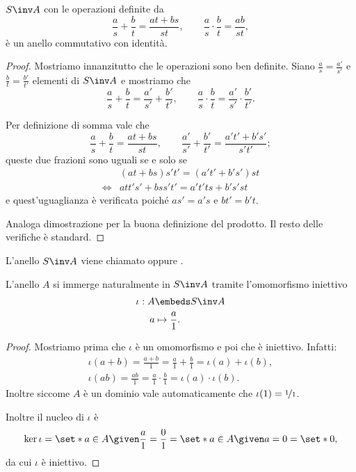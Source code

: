 \begin{proposition}{}{}
    $S\inv A$ con le operazioni definite da \[
        \frac{a}{s} + \frac{b}{t} = \frac{at + bs}{st}, \qquad \frac{a}{s} \cdot \frac{b}{t} = \frac{ab}{st},    
    \] è un anello commutativo con identità.
\end{proposition}
\begin{proof}
    Mostriamo innanzitutto che le operazioni sono ben definite. Siano $\frac{a}{s} = \frac{a'}{s'}$ e $\frac{b}{t} = \frac{b'}{t'}$ elementi di $S\inv A$ e mostriamo che \[
        \frac{a}{s} + \frac{b}{t} = \frac{a'}{s'} + \frac{b'}{t'}, \qquad \frac{a}{s} \cdot \frac{b}{t} = \frac{a'}{s'} \cdot \frac{b'}{t'}.
    \]

    Per definizione di somma vale che \[
        \frac{a}{s} + \frac{b}{t} = \frac{at + bs}{st}, \qquad \frac{a'}{s'} + \frac{b'}{t'} = \frac{a't' + b's'}{s't'};       
    \] queste due frazioni sono uguali se e solo se \begin{align*}
        &(at + bs)s't' = (a't' + b's')st\\
        \iff &att's' + bss't' = a't'ts + b's'st
    \end{align*} e quest'uguaglianza è verificata poiché $as' = a's$ e $bt' = b't$.

    Analoga dimostrazione per la buona definizione del prodotto. Il resto delle verifiche è standard.
\end{proof}

L'anello $S\inv A$ viene chiamato  oppure .

\begin{proposition}{}{}
    L'anello $A$ si immerge naturalmente in $S\inv A$ tramite l'omomorfismo iniettivo \begin{align*}
        \iota: A &\embeds S\inv A\\
        a &\mapsto \frac{a}{1}.
    \end{align*}
\end{proposition}
\begin{proof}
    Mostriamo prima che $\iota$ è un omomorfismo e poi che è iniettivo. Infatti: \begin{align*}
        \iota(a + b) = \frac{a + b}{1} = \frac{a}{1} + \frac{b}{1} = \iota(a) + \iota(b),\\
        \iota(ab) = \frac{ab}{1} = \frac{a}{1}\cdot \frac{b}{1} = \iota(a) \cdot \iota(b). 
    \end{align*}
    Inoltre siccome $A$ è un dominio vale automaticamente che $\iota(1) = \nicefrac{1}{1}$.

    Inoltre il nucleo di $\iota$ è \[
        \ker \iota = \set*{a \in A \given \frac{a}{1} = \frac{0}{1}} = \set*{a \in A \given a = 0} = \set*{0},    
    \] da cui $\iota$ è iniettivo.
\end{proof}

